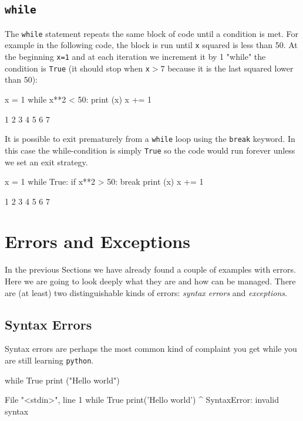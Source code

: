 \subsection{\texttt{while}}\label{while}

The \texttt{while} statement repeats the same block of code until a condition is met. For example in the following code, the block is run until \texttt{x} squared is less than 50. At the beginning \texttt{x=1} and at each iteration we increment it by 1 "while" the condition is \texttt{True} (it should stop when \texttt{x}$> 7$ because it is the last squared lower than 50):

\begin{ipythonnon}
x = 1
while x**2 < 50:
    print (x)
    x += 1	
\end{ipythonnon}
\begin{ioutput}
1
2
3
4
5
6
7	
\end{ioutput}

It is possible to exit prematurely from a \texttt{while} loop using the \texttt{break} keyword. In this case the while-condition is simply \texttt{True} so the code would run forever unless we set an exit strategy.

\begin{ipythonnon}
x = 1
while True:
    if x**2 > 50:
        break
    print (x)
    x += 1	
\end{ipythonnon}
\begin{ioutput}
1
2
3
4
5
6
7	
\end{ioutput}

\section{Errors and Exceptions}
In the previous Sections we have already found a couple of examples with errors. Here we are going to look deeply what they are and how can be managed. There are (at least) two distinguishable kinds of errors:  \emph{syntax errors} and \emph{exceptions}.

\subsection{Syntax Errors}
Syntax errors are perhaps the most common kind of complaint you get while you are still learning \texttt{python}.

\begin{ipythonnon}
while True
    print ("Hello world")
\end{ipythonnon}
\begin{ioutput}
  File "<stdin>", line 1
    while True print('Hello world')
               ^
SyntaxError: invalid syntax
\end{ioutput}

